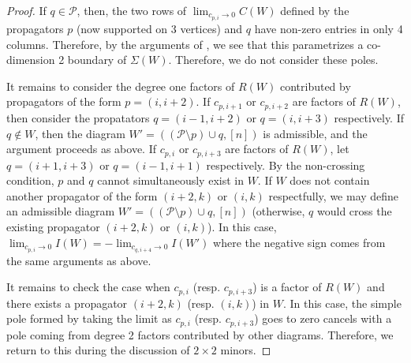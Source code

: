 \documentclass[11pt]{article}
\newcommand{\cP}{\mathcal{P}}
\theoremstyle{remark}
\theoremstyle{definition}
\begin{document}
\begin{proof}
If $q \in \cP$, then, the two rows of $\lim_{c_{p, i} \rightarrow 0}C(W)$ defined by the propagators $p$ (now supported on 3 vertices) and $q$ have non-zero entries in only 4 columns. Therefore, by the arguments of \cite{basisshapeloci}, we see that this parametrizes a co-dimension 2 boundary of $\Sigma(W)$. Therefore, we do not consider these poles. 

It remains to consider the degree one factors of $R(W)$ contributed by propagators of the form $p = (i, i+2)$. If $c_{p, i+1}$ or $c_{p, i+2}$ are factors of $R(W)$, then consider the propatators $q = (i-1, i+2)$ or $q = (i, i+3)$ respectively. If $q \not \in W$, then the diagram $W' = ((\cP \setminus p)\cup q, [n])$ is admissible, and the argument proceeds as above. If $c_{p, i}$ or $c_{p, i+3}$ are factors of $R(W)$, let $q = (i+1, i+3)$ or $q = (i-1, i+1)$ respectively. By the non-crossing condition, $p$ and $q$ cannot simultaneously exist in $W$. If $W$ does not contain another propagator of the form $(i+2, k)$ or $(i, k)$ respectfully, we may define an admissible diagram $W' = ((\cP \setminus p)\cup q, [n])$ (otherwise, $q$ would cross the existing propagator $(i+2, k)$ or $(i, k)$).  In this case, $\lim_{c_{p, i} \rightarrow 0} I(W) = -\lim_{c_{q, i+4} \rightarrow 0} I(W')$ where the negative sign comes from the same arguments as above. 

It remains to check the case when $c_{p, i}$ (resp. $c_{p, i+3}$) is a factor of $R(W)$ and there exists a propagator $(i+2, k)$ (resp. $(i, k)$) in $W$. In this case, the simple pole formed by taking the limit as $c_{p, i}$ (resp. $c_{p, i+3}$) goes to zero cancels with a pole coming from degree 2 factors contributed by other diagrams. Therefore, we return to this during the discussion of $2 \times 2$ minors. 


\end{proof}
\end{document}
